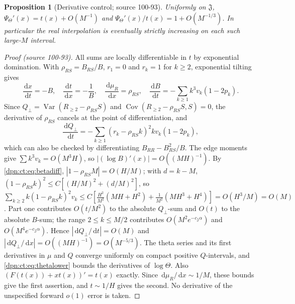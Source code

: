 \documentclass[11pt]{article}
\numberwithin{equation}{section}
\newtheorem{proposition}[theorem]{Proposition}
\theoremstyle{definition}\newtheorem{definition}[theorem]{Definition}
\theoremstyle{remark}\newtheorem{remark}[theorem]{Remark}
\newcommand{\dd}{\,\mathrm d}\newcommand{\ii}{\mathrm i}
\DeclareMathOperator{\Var}{Var}
\newcommand{\src}[1]{\textup{(source #1)}}
\begin{document}
\begin{proposition}[Derivative control; source 100-93]\label{dpn:ct:prop:deriv}
Uniformly on $\mathfrak J$,
$\Psi_\Theta'(x)=t(x)+O(M^{-1})$ and $\Psi_\Theta'(x)/t(x)=1+O(M^{-1/3})$.  In
particular the real interpolation is eventually strictly increasing on each
such large-$M$ interval.
\end{proposition}
\begin{proof}[Proof \src{100-93}]
All sums are locally differentiable in $t$ by exponential domination.  With
$\rho_{RS}=B_{RS}/B$, $r_1=0$ and $r_k=1$ for $k\ge2$, exponential tilting gives
\begin{equation}\label{dpn:ct:eq:derivs}
 \frac{\dd x}{\dd t}=-B,\quad \frac{\dd t}{\dd x}=-\frac1B,\quad
 \frac{\dd\mu_R}{\dd x}=\rho_{RS},\quad
 \frac{\dd B}{\dd t}=-\sum_{k\ge1}k^3v_k(1-2p_k).
\end{equation}
Since $Q_\perp=\Var(R_{\ge2}-\rho_{RS}S)$ and $\operatorname{Cov}(R_{\ge2}-\rho_{RS}S,S)=0$,
the derivative of $\rho_{RS}$ cancels at the point of differentiation, and
\begin{equation}\label{dpn:ct:eq:Qt}
 \frac{\dd Q_\perp}{\dd t}=-\sum_{k\ge1}(r_k-\rho_{RS}k)^2kv_k(1-2p_k),
\end{equation}
which can also be checked by differentiating $B_{RR}-B_{RS}^2/B$.  The edge
moments give $\sum k^3v_k=O(M^3H)$, so $|(\log B)'(x)|=O((MH)^{-1})$.  By
\eqref{dpn:ct:eq:betadiff}, $|1-\rho_{RS}M|=O(H/M)$; with $d=k-M$,
$(1-\rho_{RS}k)^2\le C[(H/M)^2+(d/M)^2]$, so
$\sum_{k\ge2}k(1-\rho_{RS}k)^2v_k\le C[\frac{H^2}{M^2}(MH+H^2)+\frac1{M^2}(MH^3+H^4)]
=O(H^3/M)=O(M)$.  Part one contributes $O(t/M^2)$ to the absolute
$Q_\perp$-sum and $O(t)$ to the absolute $B$-sum; the range $2\le k\le M/2$
contributes $O(M^2e^{-c_{\mathfrak J}\alpha})$ and $O(M^4e^{-c_{\mathfrak J}\alpha})$.
Hence $|\dd Q_\perp/\dd t|=O(M)$ and $|\dd Q_\perp/\dd x|=O((MH)^{-1})=O(M^{-5/3})$.
The theta series and its first derivatives in $\mu$ and $Q$ converge
uniformly on compact positive $Q$-intervals, and \eqref{dpn:ct:eq:thetalower}
bounds the derivatives of $\log\Theta$.  Also $(F(t(x))+xt(x))'=t(x)$ exactly.
Since $\dd\mu_R/\dd x\sim1/M$, these bounds give the first assertion, and
$t\sim1/H$ gives the second.  No derivative of the unspecified forward $o(1)$
error is taken.
\end{proof}
\end{document}
